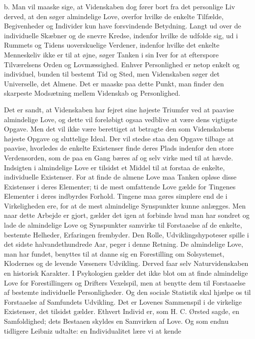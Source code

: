 \documentclass[12pt,a4paper]{article}
\newcommand{\opage}[1]{\marginnote{\footnotesize\textit{[#1]}}}
\begin{document}
b. Man vil maaske sige, at Videnskaben dog fører bort fra det personlige Liv
derved, at den søger almindelige Love, overfor hvilke de enkelte Tilfælde,
Begivenheder og Individer kun have forsvindende Betydning. Langt ud over de
individuelle Skæbner og de snevre Kredse, indenfor hvilke de udfolde sig, ud i
Rummets og Tidens uoverskuelige Verdener, indenfor hvilke det enkelte
Menneskeliv ikke er til at øjne, søger Tanken i sin Iver for at efterspore
Tilværelsens Orden og Lovmæssighed. Enhver Personlighed er netop enkelt og
individuel, bunden til bestemt Tid og Sted, men Videnskaben søger det
Universelle, det Almene. Det er maaske paa dette Punkt, man finder den skarpeste
Modsætning mellem Videnskab og Personlighed.

Det er sandt, at Videnskaben har fejret sine højeste Triumfer ved at paavise
almindelige Love, og dette vil foreløbigt ogsaa vedblive at være dens vigtigste
Opgave. Men det vil ikke være berettiget at betragte den som Videnskabens
højeste Opgave og sluttelige Ideal. Der vil stedse staa den Opgave tilbage at
paavise, hvorledes de enkelte Existenser finde deres Plads indenfor den store
Verdensorden, som de paa en Gang bæres af og selv \opage{42} virke med til at hævde.
Indsigten i almindelige Love er tilsidst et Middel til at forstaa de enkelte,
individuelle Existenser. For at finde de almene Love maa Tanken opløse disse
Existenser i deres Elementer; ti de mest omfattende Love gælde for Tingenes
Elementer i deres indbyrdes Forhold. Tingene maa gøres simplere end de i
Virkeligheden ere, for at de mest almindelige Synspunkter kunne anlægges. Men
naar dette Arbejde er gjort, gælder det igen at forbinde hvad man har sondret og
lade de almindelige Love og Synspunkter samvirke til Forstaaelse af de enkelte,
bestemte Helheder, Erfaringen frembyder. Den Rolle, Udviklingshypoteser spille i
det sidste halvandethundrede Aar, peger i denne Retning. De almindelige Love,
man har fundet, benyttes til at danne sig en Forestilling om Solsystemet,
Klodernes og de levende Væseners Udvikling. Derved faar selv Naturvidenskaben en
historisk Karakter. I Psykologien gælder det ikke blot om at finde almindelige
Love for Forestillingers og Drifters Vexelspil, men at benytte dem til
Forstaaelse af bestemte individuelle Personligheder. Og den sociale Statistik
skal hjælpe os til Forstaaelse af Samfundets Udvikling. Det er Lovenes
Sammenspil i de virkelige Existenser, det tilsidst gælder. Ethvert Individ er,
som H. C. Ørsted sagde, en Samfoldighed; dets Bestaaen skyldes en Samvirken af
Love. Og som endnu tidligere Leibniz udtalte: en Individualitet lære vi at kende
\end{document}
